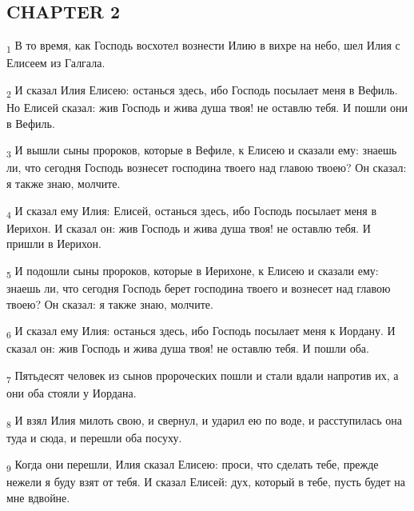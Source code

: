 \subsection{CHAPTER 2}
\begin{tcolorbox}
\textsubscript{1} В то время, как Господь восхотел вознести Илию в вихре на небо, шел Илия с Елисеем из Галгала.
\end{tcolorbox}
\begin{tcolorbox}
\textsubscript{2} И сказал Илия Елисею: останься здесь, ибо Господь посылает меня в Вефиль. Но Елисей сказал: жив Господь и жива душа твоя! не оставлю тебя. И пошли они в Вефиль.
\end{tcolorbox}
\begin{tcolorbox}
\textsubscript{3} И вышли сыны пророков, которые в Вефиле, к Елисею и сказали ему: знаешь ли, что сегодня Господь вознесет господина твоего над главою твоею? Он сказал: я также знаю, молчите.
\end{tcolorbox}
\begin{tcolorbox}
\textsubscript{4} И сказал ему Илия: Елисей, останься здесь, ибо Господь посылает меня в Иерихон. И сказал он: жив Господь и жива душа твоя! не оставлю тебя. И пришли в Иерихон.
\end{tcolorbox}
\begin{tcolorbox}
\textsubscript{5} И подошли сыны пророков, которые в Иерихоне, к Елисею и сказали ему: знаешь ли, что сегодня Господь берет господина твоего и вознесет над главою твоею? Он сказал: я также знаю, молчите.
\end{tcolorbox}
\begin{tcolorbox}
\textsubscript{6} И сказал ему Илия: останься здесь, ибо Господь посылает меня к Иордану. И сказал он: жив Господь и жива душа твоя! не оставлю тебя. И пошли оба.
\end{tcolorbox}
\begin{tcolorbox}
\textsubscript{7} Пятьдесят человек из сынов пророческих пошли и стали вдали напротив их, а они оба стояли у Иордана.
\end{tcolorbox}
\begin{tcolorbox}
\textsubscript{8} И взял Илия милоть свою, и свернул, и ударил ею по воде, и расступилась она туда и сюда, и перешли оба посуху.
\end{tcolorbox}
\begin{tcolorbox}
\textsubscript{9} Когда они перешли, Илия сказал Елисею: проси, что сделать тебе, прежде нежели я буду взят от тебя. И сказал Елисей: дух, который в тебе, пусть будет на мне вдвойне.
\end{tcolorbox}
